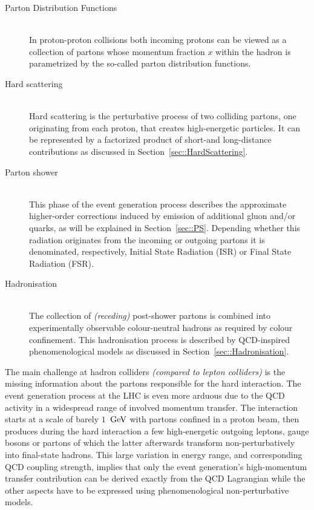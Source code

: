 \begin{myindentpar}
  \begin{description}
    \item[Parton Distribution Functions] \hfill \\
      In proton-proton collisions both incoming protons can be viewed as a collection of partons whose momentum fraction $x$ within the hadron is parametrized by the so-called parton distribution functions.
    \item[Hard scattering] \hfill \\
      Hard scattering is the perturbative process of two colliding partons, one originating from each proton, that creates high-energetic particles. It can be represented by a factorized product of short-and long-distance contributions as discussed in Section~\ref{sec::HardScattering}.
    \item[Parton shower] \hfill \\
      This phase of the event generation process describes the approximate higher-order corrections induced by emission of additional gluon and/or quarks, as will be explained in Section~\ref{sec::PS}. Depending whether this radiation originates from the incoming or outgoing partons it is denominated, respectively, Initial State Radiation (ISR) or Final State Radiation (FSR).
    \item[Hadronisation] \hfill \\
      The collection of \textit{(receding)} post-shower partons is combined into experimentally observable colour-neutral hadrons as required by colour confinement. This hadronisation process is described by QCD-inspired phenomenological models as discussed in Section~\ref{sec::Hadronisation}.
  \end{description}
\end{myindentpar}

The main challenge at hadron colliders \textit{(compared to lepton colliders)} is the missing information about the partons responsible for the hard interaction. 
The event generation process at the LHC is even more arduous due to the QCD activity in a widespread range of involved momentum transfer. %
The interaction starts at a scale of barely $1$ $\, \mathrm{GeV}$ with partons confined in a proton beam, then produces during the hard interaction a few high-energetic outgoing leptons, gauge bosons or partons of which the latter afterwards transform non-perturbatively into final-state hadrons. This large variation in energy range, and corresponding QCD coupling strength, implies that only the event generation's high-momentum transfer contribution can be derived exactly from the QCD Lagrangian while the other aspects have to be expressed using phenomenological non-perturbative models.

